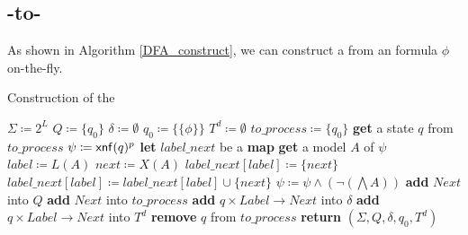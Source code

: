 \subsection{\ltlf-to-\TDFA}
As shown in Algorithm \ref{DFA_construct}, we can construct a \TDFA from an \ltlf formula $\phi$ on-the-fly.

\begin{algorithm}[H]
  \caption{Construction of the \TDFA}
  \LinesNumbered
  \label{DFA_construct}
  $\Sigma\coloneqq 2^L$\;
  $Q\coloneqq\{q_0\}$\;
  $\delta\coloneqq\emptyset$\;
  $q_0\coloneqq\{\{\phi\}\}$\;
  $T^d\coloneqq\emptyset$\;
  $to\_process\coloneqq\{q_0\}$\;
  {
    \textbf{get} a state $q$ from $to\_process$\;
    $\psi\coloneqq{\sf xnf}(q)^p$\;
    \textbf{let}  $label\_next$ be a \textbf{map}\;
    {
      \textbf{get} a model $A$ of $\psi$\;
      $label\coloneqq L(A)$\;
      $next\coloneqq X(A)$\;
      {
        $label\_next[label]\coloneqq \{next\}$\;
      }
      \Else
      {
        $label\_next[label]\coloneqq label\_next[label]\cup\{next\}$\;
      }
      $\psi\coloneqq \psi\land(\neg(\bigwedge A))$\;
    }
    {
      {
        \textbf{add} $Next$ into $Q$\;
        \textbf{add} $Next$ into $to\_process$\;
      }
      \textbf{add} $q\times Label\to Next$ into $\delta$\;
      {
        \textbf{add} $q\times Label\to Next$ into $T^d$\;
      }
    }
    \textbf{remove} $q$ from $to\_process$\;
  }
  \textbf{return} $(\Sigma,Q,\delta,q_0,T^d)$\;
\end{algorithm}
